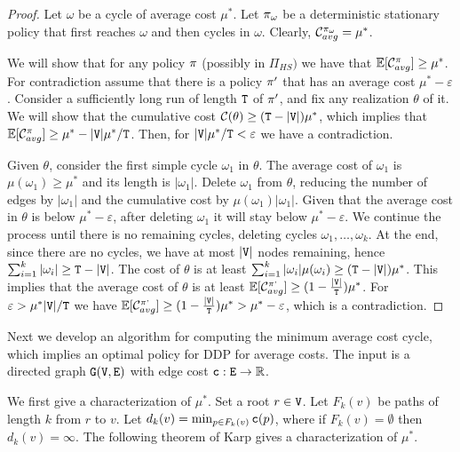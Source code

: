 \begin{proof}
Let $\omega$ be a cycle of average cost $\mu^*$. Let
$\pi_{\omega}$ be a deterministic stationary policy that first
reaches $\omega$ and then cycles in $\omega$. Clearly,
$\mathcal{C}^{\pi_\omega}_{avg}=\mu^*$.

We will show that for any policy $\pi$ (possibly in $\Pi_{HS})$ we
have that $\mathbb{E}[\mathcal{C}^\pi_{avg}]\geq \mu^*$. For contradiction
assume that there is a policy $\pi'$ that has an average cost
$\mu^*-\varepsilon$. Consider a sufficiently long run of length
${\tt T}$ of $\pi'$, and fix any realization $\theta$ of it.
We will show that the cumulative cost $\mathcal{C}(\theta)\geq
({\tt T}-|{\tt V}|)\mu^*$, which implies that $\mathbb{E}[\mathcal{C}^\pi_{avg}]\geq
\mu^* -|{\tt V}|\mu^*/{\tt T}$. Then, for $|{\tt V}|\mu^*/{\tt T}<\varepsilon$ we have a contradiction.

Given $\theta$, consider the first simple cycle $\omega_1$ in
$\theta$. The average cost of $\omega_1$ is $\mu(\omega_1)\geq\mu^*$ and its length is $|\omega_1|$.
Delete $\omega_1$ from $\theta$, reducing the number of edges by
$|\omega_1|$ and the cumulative cost by $\mu(\omega_1)|\omega_1|$. Given that the average cost in $\theta$ is below $\mu^*-\varepsilon$, after deleting $\omega_1$ it will stay below  $\mu^*-\varepsilon$.
We
continue the process until there is no remaining cycles, deleting cycles $\omega_1, \ldots , \omega_k$. At the end, since there are no cycles, we have at most $|{\tt V}|$ nodes remaining, hence $\sum_{i=1}^k |\omega_i|\geq {\tt T}-|{\tt V}|$. The cost of $\theta$ is at least $\sum_{i=1}^k |\omega_i|\mu(\omega_i)\geq({\tt T}-|{\tt V}|)\mu^*$.
This implies that the average cost of $\theta$ is at least $\mathbb{E}[\mathcal{C}_{avg}^{\pi^{,}}]\geq
(1-\frac{|{\tt V}|}{{\tt T}})\mu^*$. For $\varepsilon>\mu^* |{\tt V}|/{\tt T}$ we
have $\mathbb{E}[\mathcal{C}_{avg}^{\pi^{,}}]\geq
(1-\frac{|{\tt V}|}{{\tt T}})\mu^*>\mu^*-\varepsilon$, which is  a contradiction.
\end{proof}

Next we develop an algorithm for computing the minimum average cost
cycle, which implies an optimal policy for DDP for average costs.
The input is a directed graph ${\tt G}({\tt V},{\tt E})$ with edge cost ${\tt c}:{\tt E}\rightarrow {\mathbb R}$.

We first give a characterization of $\mu^*$. Set a root $r\in {\tt V}$.
Let $F_{k}(v)$ be paths of length $k$ from $r$ to $v$. Let
$d_{k}(v)=\min_{p\in F_{k}(v)} {\tt c}(p)$, where if
$F_{k}(v)=\emptyset$ then $d_{k}(v)=\infty$. The following theorem of Karp \cite{Karp78}
gives a characterization of $\mu^*$.

